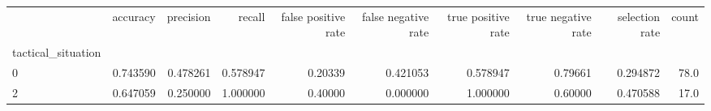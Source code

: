 \begin{tabular}{lrrrrrrrrr}
\toprule
{} &  accuracy &  precision &    recall &  false positive rate &  false negative rate &  true positive rate &  true negative rate &  selection rate &  count \\
tactical\_situation &           &            &           &                      &                      &                     &                     &                 &        \\
\midrule
0                  &  0.743590 &   0.478261 &  0.578947 &              0.20339 &             0.421053 &            0.578947 &             0.79661 &        0.294872 &   78.0 \\
2                  &  0.647059 &   0.250000 &  1.000000 &              0.40000 &             0.000000 &            1.000000 &             0.60000 &        0.470588 &   17.0 \\
\bottomrule
\end{tabular}
